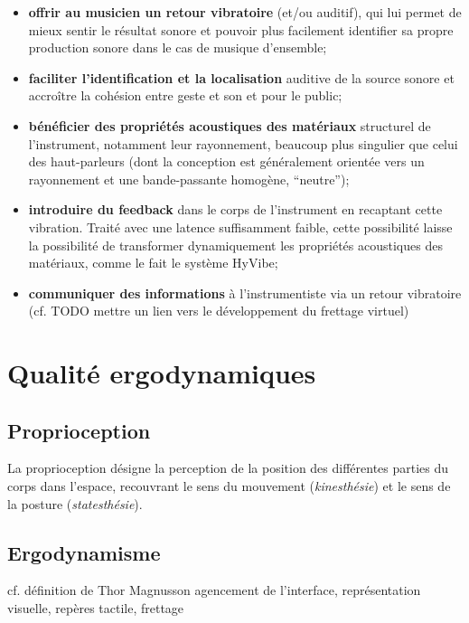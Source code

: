 \vspace{-1em}
\begin{itemize}[noitemsep]
	\item \textbf{offrir au musicien un retour vibratoire }(et/ou auditif), qui lui permet de mieux sentir le résultat sonore et pouvoir plus facilement identifier sa propre production sonore dans le cas de musique d'ensemble;
	\item \textbf{faciliter l'identification et la localisation} auditive de la source sonore et accroître la cohésion entre geste et son et pour le public;
	\item \textbf{bénéficier des propriétés acoustiques des matériaux} structurel de l'instrument, notamment leur rayonnement, beaucoup plus singulier que celui des haut-parleurs (dont la conception est généralement orientée vers un rayonnement et une bande-passante homogène, ``neutre'');
	\item \textbf{introduire du feedback} dans le corps de l'instrument en recaptant cette vibration. Traité avec une latence suffisamment faible, cette possibilité laisse la possibilité de transformer dynamiquement les propriétés acoustiques des matériaux, comme le fait le système HyVibe;
	\item \textbf{communiquer des informations} à l'instrumentiste via un retour vibratoire (cf. TODO mettre un lien vers le développement du frettage virtuel)
\end{itemize}


\section{Qualité ergodynamiques}


\subsection{Proprioception}
La proprioception désigne la perception de la position des différentes parties du corps dans l'espace, recouvrant le sens du mouvement (\textit{kinesthésie}) et le sens de la posture (\textit{statesthésie}).


\subsection{Ergodynamisme}
cf. définition de Thor Magnusson
agencement de l’interface, représentation visuelle, repères tactile, frettage

